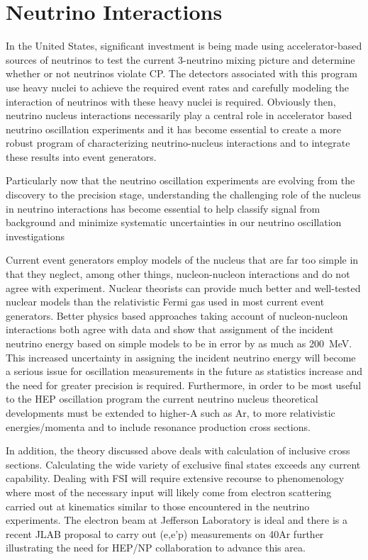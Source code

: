 \section{Neutrino Interactions}
\label{sec:Interactions}

In the United States, significant investment is being made using
accelerator-based sources of neutrinos to test the current 3-neutrino
mixing picture and determine whether or not neutrinos violate CP.  The
detectors associated with this program use heavy nuclei to achieve the
required event rates and carefully modeling the interaction of
neutrinos with these heavy nuclei is required.  Obviously then,
neutrino nucleus interactions necessarily play a central role in
accelerator based neutrino oscillation experiments and it has become
essential to create a more robust program of characterizing
neutrino-nucleus interactions and to integrate these results into
event generators.

Particularly now that the neutrino oscillation experiments are
evolving from the discovery to the precision stage, understanding the
challenging role of the nucleus in neutrino interactions has become
essential to help classify signal from background and minimize
systematic uncertainties in our neutrino oscillation investigations

 
Current event generators employ models of the nucleus that are far too
simple in that they neglect, among other things, nucleon-nucleon
interactions and do not agree with
experiment\cite{AguilarArevalo:2010zc,Boyd-Dytman}.  Nuclear
theorists can provide much better and well-tested nuclear models than
the relativistic Fermi gas used in most current event generators.
Better physics based approaches taking account of nucleon-nucleon
interactions both agree with data and show that assignment of the
incident neutrino energy based on simple models to be in error by as
much as 200~MeV\cite{Martini:2011wp,Lalakulich:2012hs,Shneor:2007tu}. This
increased uncertainty in assigning the incident neutrino energy will
become a serious issue for oscillation measurements in the future as
statistics increase and the need for greater precision is
required\cite{1412.4294}.  Furthermore, in order to be most useful to
the HEP oscillation program the current neutrino nucleus theoretical
developments must be extended to higher-A such as Ar, to more
relativistic energies/momenta and to include resonance production
cross sections.

In addition, the theory discussed above deals with calculation of
inclusive cross sections. Calculating the wide variety of exclusive
final states exceeds any current capability. Dealing with FSI will
require extensive recourse to phenomenology where most of the
necessary input will likely come from electron scattering carried out
at kinematics similar to those encountered in the neutrino
experiments. The electron beam at Jefferson Laboratory is ideal and
there is a recent JLAB proposal\cite{Benhar:2014nca} to carry out
(e,e’p) measurements on 40Ar further illustrating the need for HEP/NP
collaboration to advance this area.

